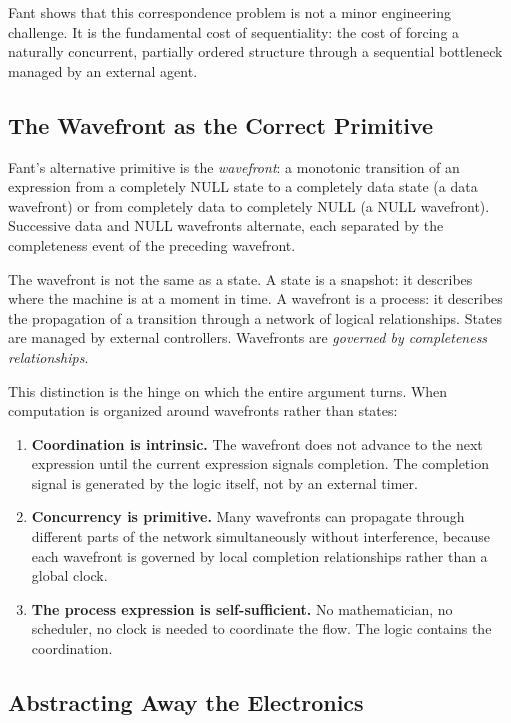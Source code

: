 \documentclass[12pt, a4paper]{article}
\begin{document}
Fant shows that this correspondence problem is not a minor engineering
challenge. It is the fundamental cost of sequentiality: the cost of
forcing a naturally concurrent, partially ordered structure through
a sequential bottleneck managed by an external agent.

\subsection{The Wavefront as the Correct Primitive}

Fant's alternative primitive is the \emph{wavefront}: a monotonic
transition of an expression from a completely NULL state to a
completely data state (a data wavefront) or from completely data to
completely NULL (a NULL wavefront). Successive data and NULL wavefronts
alternate, each separated by the completeness event of the preceding
wavefront.

The wavefront is not the same as a state. A state is a snapshot: it
describes where the machine is at a moment in time. A wavefront is a
process: it describes the propagation of a transition through a network
of logical relationships. States are managed by external controllers.
Wavefronts are \emph{governed by completeness relationships}.

This distinction is the hinge on which the entire argument turns. When
computation is organized around wavefronts rather than states:

\begin{enumerate}
\item \textbf{Coordination is intrinsic.} The wavefront does not
  advance to the next expression until the current expression
  signals completion. The completion signal is generated by the
  logic itself, not by an external timer.

\item \textbf{Concurrency is primitive.} Many wavefronts can propagate
  through different parts of the network simultaneously without
  interference, because each wavefront is governed by local completion
  relationships rather than a global clock.

\item \textbf{The process expression is self-sufficient.} No
  mathematician, no scheduler, no clock is needed to coordinate the
  flow. The logic contains the coordination.
\end{enumerate}

\subsection{Abstracting Away the Electronics}
\end{document}
